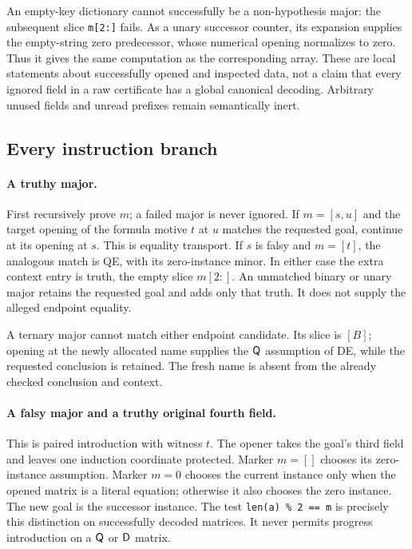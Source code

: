 An empty-key dictionary cannot successfully be a non-hypothesis major:
the subsequent slice \texttt{m[2:]} fails. As a unary successor counter,
its expansion supplies the empty-string zero predecessor, whose numerical
opening normalizes to zero. Thus it gives the same computation as the
corresponding array. These are local statements about successfully opened
and inspected data, not a claim that every ignored field in a raw
certificate has a global canonical decoding. Arbitrary unused fields
and unread prefixes remain semantically inert.

\subsection{Every instruction branch}

\paragraph{A truthy major.}
First recursively prove $m$; a failed major is never ignored. If
$m=[s,u]$ and the target opening of the formula motive $t$ at $u$
matches the requested goal, continue at its opening at $s$. This is
equality transport. If $s$ is falsy and $m=[t]$, the analogous match is
QE, with its zero-instance minor. In either case the extra context entry
is truth, the empty slice $m[2:]$. An unmatched binary or unary major
retains the requested goal and adds only that truth. It does not supply
the alleged endpoint equality.

A ternary major cannot match either endpoint candidate. Its slice is
$[B]$; opening at the newly allocated name supplies the $\mathsf Q$ assumption
of DE, while the requested conclusion is retained. The fresh name is
absent from the already checked conclusion and context.

\paragraph{A falsy major and a truthy original fourth field.}
This is paired introduction with witness $t$. The opener takes the goal's
third field and leaves one induction coordinate protected. Marker $m=[]$
chooses its zero-instance assumption. Marker $m=0$ chooses the current
instance only when the opened matrix is a literal equation; otherwise
it also chooses the zero instance. The new goal is the successor
instance. The test \texttt{len(a) \% 2 == m} is precisely this distinction
on successfully decoded matrices. It never permits progress introduction
on a $\mathsf Q$ or $\mathsf D$ matrix.

